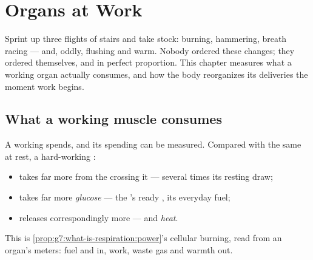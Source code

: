 \chapter{Organs at Work}\label{ch:g7:organs-at-work}

Sprint up three flights of stairs and take stock: 
burning,  hammering, breath racing --- and, oddly,
 flushing and warm. Nobody ordered these changes; they
ordered themselves, and in perfect proportion. This chapter
measures what a working organ actually consumes, and how
the body reorganizes its deliveries the moment work begins.

\section{What a working muscle consumes}

\begin{proposition}\label{prop:g7:organs-at-work:bill}
A working  spends, and its spending can be measured.
Compared with the same  at rest, a hard-working
:
\begin{itemize}
  \item takes far more \emph{} from the 
        crossing it --- several times its resting draw;
  \item takes far more \emph{glucose} --- the
        's ready , its everyday fuel;
  \item releases correspondingly more \emph{}
        --- and \emph{heat}.
\end{itemize}
This is \cref{prop:g7:what-is-respiration:power}'s cellular
burning, read from an organ's meters: fuel and  in,
work, waste gas and warmth out.
\end{proposition}
\admitted

